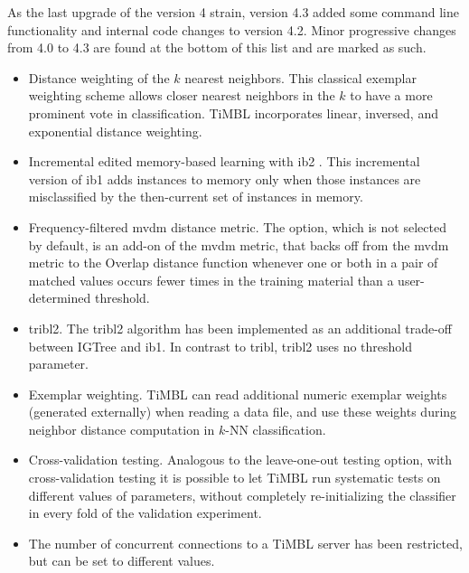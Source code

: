 \documentclass{book}
\begin{document}
As the last upgrade of the version 4 strain, version 4.3 added some
command line functionality and internal code changes to version
4.2. Minor progressive changes from 4.0 to 4.3 are found at the bottom
of this list and are marked as such.

\begin{itemize}

\item Distance weighting of the $k$ nearest neighbors. This classical
exemplar weighting scheme \cite{Dudani76} allows closer nearest
neighbors in the $k$ to have a more prominent vote in
classification. TiMBL incorporates linear, inversed, and exponential
distance weighting.

\item Incremental edited memory-based learning with {\sc ib2}
\cite{Aha+91}. This incremental version of {\sc ib1} adds instances to
memory only when those instances are misclassified by the then-current
set of instances in memory.

\item Frequency-filtered {\sc mvdm} distance metric. The option, which is
not selected by default, is an add-on of the {\sc mvdm} metric, that backs
off from the {\sc mvdm} metric to the Overlap distance function whenever one
or both in a pair of matched values occurs fewer times in the training
material than a user-determined threshold.

\item {\sc tribl2}. The {\sc tribl2} algorithm has been implemented
as an additional trade-off between {\sc IGTree} and {\sc ib1}. In
contrast to {\sc tribl}, {\sc tribl2} uses no threshold parameter.

\item Exemplar weighting. TiMBL can read additional numeric exemplar
weights (generated externally) when reading a data file, and use these
weights during neighbor distance computation in $k$-NN classification.

\item Cross-validation testing. Analogous to the leave-one-out testing
option, with cross-validation testing it is possible to let TiMBL run
systematic tests on different values of parameters, without completely
re-initializing the classifier in every fold of the validation experiment.

\item The number of concurrent connections to a TiMBL server has been
restricted, but can be set to different values.


\end{itemize}
\end{document}
